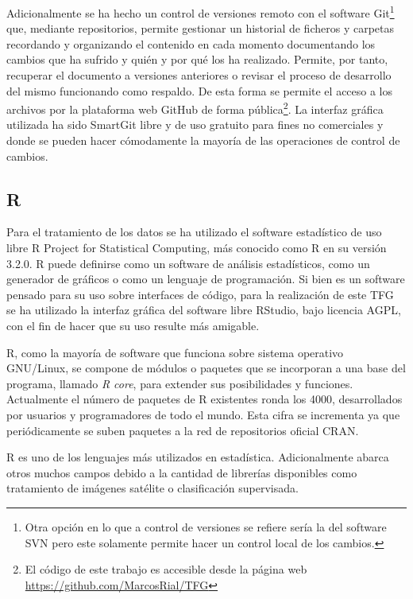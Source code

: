 Adicionalmente se ha hecho un control de versiones remoto con el software Git\footnote{Otra opción en lo que a control de versiones se refiere sería la del software \ac{SVN} \citep{Latex2011} pero este solamente permite hacer un control local de los cambios.} que, mediante repositorios, permite gestionar un historial de ficheros y carpetas recordando y organizando el contenido en cada momento documentando los cambios que ha sufrido y quién y por qué los ha realizado. Permite, por tanto, recuperar el documento a versiones anteriores o revisar el proceso de desarrollo del mismo funcionando como respaldo. De esta forma se permite el acceso a los archivos por la plataforma web GitHub de forma pública\footnote{El código de este trabajo es accesible desde la página web \url{https://github.com/MarcosRial/TFG}}. La interfaz gráfica utilizada ha sido SmartGit \citep{GmbH2015} libre y de uso gratuito para fines no comerciales y donde se pueden hacer cómodamente la mayoría de las operaciones de control de cambios.\Sep

\subsection{R}
Para el tratamiento de los datos se ha utilizado el software estadístico de uso libre R Project for Statistical Computing, más conocido como R \citep{R2013} en su versión 3.2.0. R puede definirse como un software de análisis estadísticos, como un generador de gráficos o como un lenguaje de programación. Si bien es un software pensado para su uso sobre interfaces de código, para la realización de este \ac{TFG} se ha utilizado la interfaz gráfica del software libre RStudio, bajo licencia AGPL, con el fin de hacer que su uso resulte más amigable.\Sep

R, como la mayoría de software que funciona sobre sistema operativo GNU/Linux, se compone de módulos o paquetes que se incorporan a una base del programa, llamado \textit{R core}, para extender sus posibilidades y funciones. Actualmente el número de paquetes de R existentes ronda los 4000, desarrollados por usuarios y programadores de todo el mundo. Esta cifra se incrementa ya que periódicamente se suben paquetes a la red de repositorios oficial \ac{CRAN}.\Sep

R es uno de los lenguajes más utilizados en estadística. Adicionalmente abarca otros muchos campos debido a la cantidad de librerías disponibles como tratamiento de imágenes satélite o clasificación supervisada.

